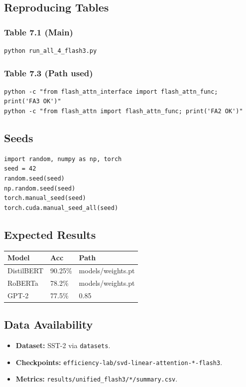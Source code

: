 \subsection{Reproducing Tables}

\subsubsection{Table 7.1 (Main)}
\begin{lstlisting}
python run_all_4_flash3.py
\end{lstlisting}

\subsubsection{Table 7.3 (Path used)}
\begin{lstlisting}
python -c "from flash_attn_interface import flash_attn_func; print('FA3 OK')"
python -c "from flash_attn import flash_attn_func; print('FA2 OK')"
\end{lstlisting}

\subsection{Seeds}

\begin{lstlisting}
import random, numpy as np, torch
seed = 42
random.seed(seed)
np.random.seed(seed)
torch.manual_seed(seed)
torch.cuda.manual_seed_all(seed)
\end{lstlisting}

\subsection{Expected Results}

\begin{table}[H]
\centering
\small
\begin{tabular}{lll}
\toprule
\textbf{Model} & \textbf{Acc} & \textbf{Path} \\
\midrule
DistilBERT & 90.25\% & models/weights.pt \\
RoBERTa & 78.2\% & models/weights.pt \\
GPT-2 & 77.5\% & 0.85 \\
\bottomrule
\end{tabular}
\end{table}

\subsection{Data Availability}

\begin{itemize}
\item \textbf{Dataset:} SST-2 via \texttt{datasets}.
\item \textbf{Checkpoints:} \texttt{efficiency-lab/svd-linear-attention-*-flash3}.
\item \textbf{Metrics:} \texttt{results/unified\_flash3/*/summary.csv}.

\end{itemize}
